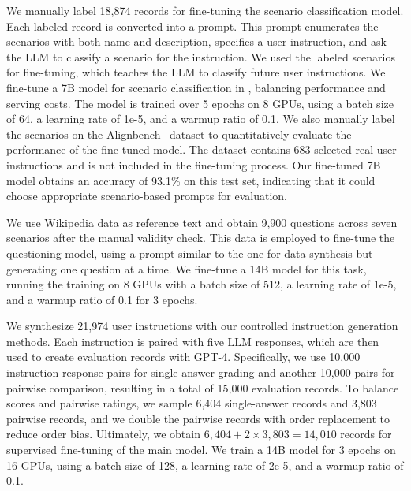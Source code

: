 We manually label 18,874 records for fine-tuning the scenario classification model. Each labeled record is converted into a prompt. %
This prompt enumerates the scenarios with both name and description, specifies a user instruction, and ask the LLM to classify a scenario for the instruction. We used the labeled scenarios for fine-tuning, which teaches the LLM to classify future user instructions.
%
We fine-tune a 7B model for scenario classification in \modelname, balancing performance and serving costs. The model is trained over 5 epochs on 8 GPUs, using a batch size of 64, a learning rate of 1e-5, and a warmup ratio of 0.1. 
We also manually label the scenarios on the Alignbench~\cite{liu2023alignbench} dataset to quantitatively evaluate the performance of the fine-tuned model. The dataset contains 683 selected real user instructions and is  not included in the fine-tuning process. Our fine-tuned 7B model obtains an accuracy of 93.1\% on this test set, indicating that it could choose appropriate scenario-based prompts for evaluation.



We use Wikipedia data as reference text and obtain 9,900 questions across seven scenarios after the manual validity check. 
This data is employed to fine-tune the questioning model, using a prompt similar to the one for data synthesis %
but generating one question at a time.
We fine-tune a 14B model for this task, running the training on 8 GPUs with a batch size of 512, a learning rate of 1e-5, and a warmup ratio of 0.1 for 3 epochs.

We synthesize 21,974 user instructions with our controlled instruction generation methods. Each instruction is paired with five LLM responses, which are then used to create evaluation records with GPT-4. Specifically, we use 10,000 instruction-response pairs for single answer grading and another 10,000 pairs for pairwise comparison, resulting in a total of 15,000 evaluation records.
To balance scores and pairwise ratings, we sample 6,404 single-answer records and 3,803 pairwise records, and we double the pairwise records with order replacement to reduce order bias. Ultimately, we obtain $6,404 + 2 \times 3,803 = 14,010$ records for supervised fine-tuning of the main model. %
We train a 14B model for 3 epochs on 16 GPUs, using a batch size of 128, a learning rate of 2e-5, and a warmup ratio of 0.1. 



